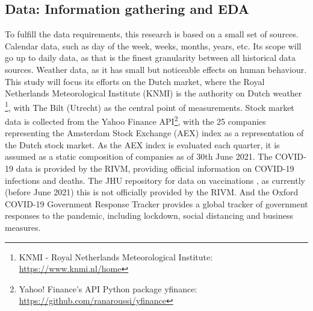 \subsection{Data: Information gathering and EDA}
\label{sec:data}
To fulfill the data requirements, this research is based on a small set of sources. Calendar data, such as day of the week, weeks, months, years, etc. Its scope will go up to daily data, as that is the finest granularity between all historical data sources.
Weather data, as it has small but noticeable effects on human behaviour. This study will focus its efforts on the Dutch market, where the Royal Netherlands Meteorological Institute (KNMI) is the authority on Dutch weather \footnote{KNMI - Royal Netherlands Meteorological Institute: \url{https://www.knmi.nl/home}}, with The Bilt (Utrecht) as the central point of measurements.
Stock market data is collected from the Yahoo Finance API\footnote{Yahoo! Finance's API Python package yfinance: \url{https://github.com/ranaroussi/yfinance}}, with the 25 companies representing the Amsterdam Stock Exchange (AEX) index as a representation of the Dutch stock market. As the AEX index is evaluated each quarter, it is assumed as a static composition of companies as of 30th June 2021.
The COVID-19 data is provided by the RIVM, providing official information on COVID-19 infections and deaths. The JHU repository for data on vaccinations \cite{dong2020interactive}, as currently (before June 2021) this is not officially provided by the RIVM. And the Oxford COVID-19 Government Response Tracker \cite{hale2020variation} provides a global tracker of government responses to the pandemic, including lockdown, social distancing and business measures.

